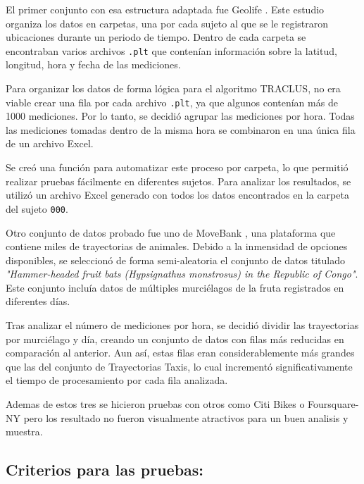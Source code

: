 El primer conjunto con esa estructura adaptada fue Geolife \cite{geolife_trajectories}. Este estudio organiza los datos en carpetas, una por cada sujeto al que se le registraron ubicaciones durante un periodo de tiempo. Dentro de cada carpeta se encontraban varios archivos \texttt{.plt} que contenían información sobre la latitud, longitud, hora y fecha de las mediciones. 

Para organizar los datos de forma lógica para el algoritmo TRACLUS, no era viable crear una fila por cada archivo \texttt{.plt}, ya que algunos contenían más de 1000 mediciones. Por lo tanto, se decidió agrupar las mediciones por hora. Todas las mediciones tomadas dentro de la misma hora se combinaron en una única fila de un archivo Excel.

Se creó una función para automatizar este proceso por carpeta, lo que permitió realizar pruebas fácilmente en diferentes sujetos. Para analizar los resultados, se utilizó un archivo Excel generado con todos los datos encontrados en la carpeta del sujeto \texttt{000}.

Otro conjunto de datos probado fue uno de MoveBank \cite{movebank}, una plataforma que contiene miles de trayectorias de animales. Debido a la inmensidad de opciones disponibles, se seleccionó de forma semi-aleatoria el conjunto de datos titulado \textit{"Hammer-headed fruit bats (Hypsignathus monstrosus) in the Republic of Congo"}. Este conjunto incluía datos de múltiples murciélagos de la fruta registrados en diferentes días. 

Tras analizar el número de mediciones por hora, se decidió dividir las trayectorias por murciélago y día, creando un conjunto de datos con filas más reducidas en comparación al anterior. Aun así, estas filas eran considerablemente más grandes que las del conjunto de Trayectorias Taxis, lo cual incrementó significativamente el tiempo de procesamiento por cada fila analizada.

Ademas de estos tres se hicieron pruebas con otros como Citi Bikes \cite{} o Foursquare-NY \cite{} pero los resultado no fueron visualmente atractivos para un buen analisis y muestra.

\subsection{Criterios para las pruebas:}

